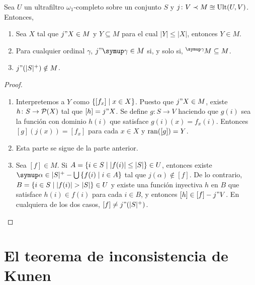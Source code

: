 \begin{teo}\label{teo:ultrafilters-omega1}
    Sea $U$ un ultrafiltro $\omega_1$-completo sobre un conjunto $S$ y
    $j\colon V\prec M\approxeq\operatorname{Ult}(U,V)$. Entonces,
    \begin{enumerate}[label=(\roman*)]
        \item Sea $X$ tal que $j"X\in M$ y $Y\subseteq M$ para el cual $|Y|\leq|X|$,
            entonces $Y\in M$.
        \item Para cualquier ordinal $\gamma$, $j"\gamma\in M$ si, y solo si,
            $\hbox{}^\gamma\kern-1pt M\subseteq M$.
        \item $j"(|S|^+)\notin M$.
    \end{enumerate}
\end{teo}

\begin{proof}\phantom{a}
    \begin{enumerate}[label=(\roman*)]
        \item Interpretemos a $Y$ como $\left\{ [f_x]\mid x\in X \right\}$. Puesto que $j"X\in M$,
            existe $h\colon S\to\pwset{X}$ tal que $[h]=j"X$. Se define $g\colon S\to V$
            haciendo que $g(i)$ sea la función con dominio $h(i)$ que satisface
            $g(i)(x) = f_x(i)$. Entonces $[g](j(x)) = [f_x]$ para cada $x\in X$ y
            $\operatorname{ran}([g]) = Y$.
        \item Esta parte se sigue de la parte anterior.
        \item Sea $[f]\in M$. Si $A = \left\{ i\in S\mid |f(i)|\leq|S| \right\}\in U$,
            entonces existe $\alpha\in|S|^+ - \bigcup\set{f(i)\mid i\in A}$ tal que
            $j(\alpha)\notin [f]$. De lo contrario, $B=\set{i\in S\mid |f(i)|>|S|}\in U$
            y existe una función inyectiva $h$ en $B$ que satisface $h(i)\in f(i)$
            para cada $i\in B$, y entonces $[h]\in[f]-j"V$. En cualquiera de los dos casos,
            $[f]\neq j"(|S|^+)$.
    \end{enumerate}
\end{proof}

\fi
\ifmainproofs
\chapter{El teorema de inconsistencia de Kunen}
\label{cap:teorema-kunen}
\thispagestyle{empty}

